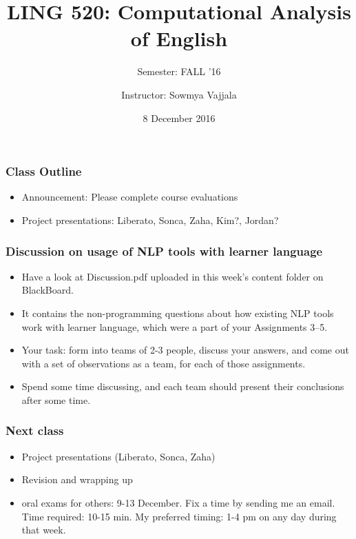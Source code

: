 \documentclass{beamer}
\author[Sowmya Vajjala]{Instructor: Sowmya Vajjala}
\title[LING 520]{LING 520: Computational Analysis of English}
\subtitle{Semester: FALL '16}
\date{8 December 2016}
\institute{Iowa State University, USA}
\begin{document}
\begin{frame}\titlepage
\end{frame}

\begin{frame}
\frametitle{Class Outline}
\begin{itemize}
\item Announcement: Please complete course evaluations
\item Project presentations: Liberato, Sonca, Zaha, Kim?, Jordan?
\end{itemize}
\end{frame}

\begin{frame}
\frametitle{Discussion on usage of NLP tools with learner language }
\begin{itemize}
\item Have a look at Discussion.pdf uploaded in this week's content folder on BlackBoard. 
\item It contains the non-programming questions about how existing NLP tools work with learner language, which were a part of your Assignments 3--5.
\item Your task: form into teams of 2-3 people, discuss your answers, and come out with a set of observations as a team, for each of those assignments. 
\item Spend some time discussing, and each team should present their conclusions after some time.
\end{itemize}
\end{frame}

\begin{frame} %
\frametitle{Next class}
\begin{itemize}
\item Project presentations (Liberato, Sonca, Zaha)
\item Revision and wrapping up
\item oral exams for others: 9-13 December. Fix a time by sending me an email. Time required: 10-15 min. My preferred timing: 1-4 pm on any day during that week. 
\end{itemize}
\end{frame}
\end{document}
